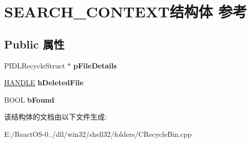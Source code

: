 \hypertarget{struct_s_e_a_r_c_h___c_o_n_t_e_x_t}{}\section{S\+E\+A\+R\+C\+H\+\_\+\+C\+O\+N\+T\+E\+X\+T结构体 参考}
\label{struct_s_e_a_r_c_h___c_o_n_t_e_x_t}
\subsection*{Public 属性}
\begin{DoxyCompactItemize}
\item 
\mbox{\label{struct_s_e_a_r_c_h___c_o_n_t_e_x_t_a82a52772ecbe80794987ac0ed76e6990}} 
P\+I\+D\+L\+Recycle\+Struct $\ast$ {\bfseries p\+File\+Details}
\item 
\mbox{\label{struct_s_e_a_r_c_h___c_o_n_t_e_x_t_ae8386407b125dbb28464d598ef10461c}} 
\hyperlink{interfacevoid}{H\+A\+N\+D\+LE} {\bfseries h\+Deleted\+File}
\item 
\mbox{\label{struct_s_e_a_r_c_h___c_o_n_t_e_x_t_a0f964c1ff5310d0b18f3c13d4ab6d1cf}} 
B\+O\+OL {\bfseries b\+Found}
\end{DoxyCompactItemize}


该结构体的文档由以下文件生成\+:\begin{DoxyCompactItemize}
\item 
E\+:/\+React\+O\+S-\/0../dll/win32/shell32/folders/C\+Recycle\+Bin.\+cpp\end{DoxyCompactItemize}
